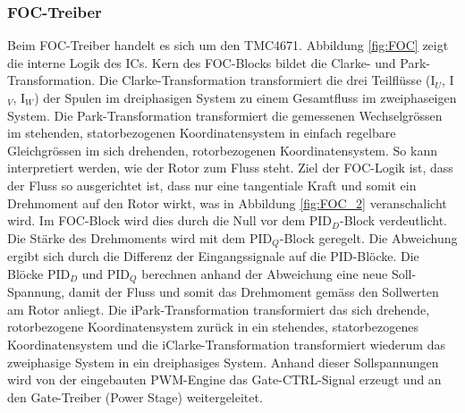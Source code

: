 \subsubsection{FOC-Treiber}
\label{subsubsec:FOC-Treiber_TMC4671}


Beim FOC-Treiber handelt es sich um den TMC4671. Abbildung \ref{fig:FOC} zeigt die interne Logik des ICs. Kern des FOC-Blocks bildet die Clarke- und Park-Transformation. Die Clarke-Transformation transformiert die drei Teilflüsse (I$_U$, I$_V$, I$_W$) der Spulen im dreiphasigen System zu einem Gesamtfluss im zweiphaseigen System. Die Park-Transformation transformiert die gemessenen Wechselgrössen im stehenden, statorbezogenen Koordinatensystem in einfach regelbare Gleichgrössen im sich drehenden, rotorbezogenen Koordinatensystem. So kann interpretiert werden, wie der Rotor zum Fluss steht. Ziel der FOC-Logik ist, dass der Fluss so ausgerichtet ist, dass nur eine tangentiale Kraft und somit ein Drehmoment auf den Rotor wirkt, was in Abbildung \ref{fig:FOC_2} veranschalicht wird. Im FOC-Block wird dies durch die Null vor dem PID$_D$-Block verdeutlicht. Die Stärke des Drehmoments wird mit dem PID$_Q$-Block geregelt. Die Abweichung ergibt sich durch die Differenz der Eingangssignale auf die PID-Blöcke. Die Blöcke PID$_D$ und PID$_Q$ berechnen anhand der Abweichung eine neue Soll-Spannung, damit der Fluss und somit das Drehmoment gemäss den Sollwerten am Rotor anliegt. Die iPark-Transformation transformiert das sich drehende, rotorbezogene Koordinatensystem zurück in ein stehendes, statorbezogenes Koordinatensystem und die iClarke-Transformation transformiert wiederum das zweiphasige System in ein dreiphasiges System. Anhand dieser Sollspannungen wird von der eingebauten PWM-Engine das Gate-CTRL-Signal erzeugt und an den Gate-Treiber (Power Stage) weitergeleitet.


